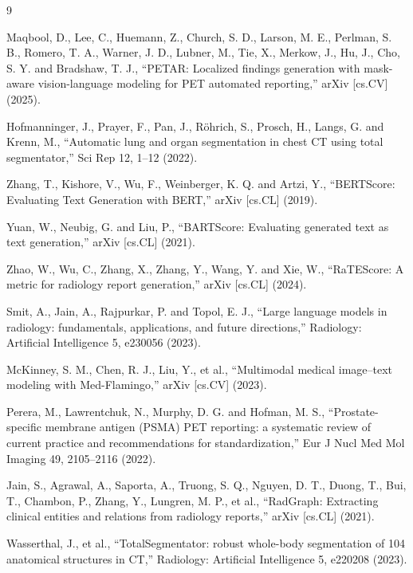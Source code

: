\documentclass[10pt]{article}
\begin{document}
\begin{thebibliography}{9}

Maqbool, D., Lee, C., Huemann, Z., Church, S. D., Larson, M. E., Perlman, S. B., Romero, T. A., Warner, J. D., Lubner, M., Tie, X., Merkow, J., Hu, J., Cho, S. Y. and Bradshaw, T. J., ``PETAR: Localized findings generation with mask-aware vision-language modeling for PET automated reporting,'' arXiv [cs.CV] (2025).

Hofmanninger, J., Prayer, F., Pan, J., Röhrich, S., Prosch, H., Langs, G. and Krenn, M., ``Automatic lung and organ segmentation in chest CT using total segmentator,'' Sci Rep 12, 1--12 (2022).

Zhang, T., Kishore, V., Wu, F., Weinberger, K. Q. and Artzi, Y., ``BERTScore: Evaluating Text Generation with BERT,'' arXiv [cs.CL] (2019).

Yuan, W., Neubig, G. and Liu, P., ``BARTScore: Evaluating generated text as text generation,'' arXiv [cs.CL] (2021).

Zhao, W., Wu, C., Zhang, X., Zhang, Y., Wang, Y. and Xie, W., ``RaTEScore: A metric for radiology report generation,'' arXiv [cs.CL] (2024).


Smit, A., Jain, A., Rajpurkar, P. and Topol, E. J., ``Large language models in radiology: fundamentals, applications, and future directions,'' Radiology: Artificial Intelligence 5, e230056 (2023).

McKinney, S. M., Chen, R. J., Liu, Y., et al., ``Multimodal medical image--text modeling with Med-Flamingo,'' arXiv [cs.CV] (2023).

Perera, M., Lawrentchuk, N., Murphy, D. G. and Hofman, M. S., ``Prostate-specific membrane antigen (PSMA) PET reporting: a systematic review of current practice and recommendations for standardization,'' Eur J Nucl Med Mol Imaging 49, 2105--2116 (2022).

Jain, S., Agrawal, A., Saporta, A., Truong, S. Q., Nguyen, D. T., Duong, T., Bui, T., Chambon, P., Zhang, Y., Lungren, M. P., et al., ``RadGraph: Extracting clinical entities and relations from radiology reports,'' arXiv [cs.CL] (2021).

Wasserthal, J., et al., ``TotalSegmentator: robust whole-body segmentation of 104 anatomical structures in CT,'' Radiology: Artificial Intelligence 5, e220208 (2023).

\end{thebibliography}
\end{document}
